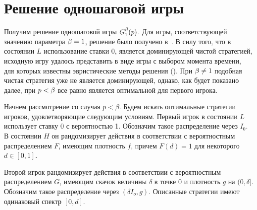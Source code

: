 {\section{Решение одношаговой игры}
\label{ch3:sec:1st}

Получим решение одношаговой игры $G^{\beta}_1(p)$.
Для игры, соответствующей значению параметра $\beta = 1$, решение было получено в~\cite{sandomirskaya12}.
В силу того, что в состоянии $L$ использование ставки $0$, является доминирующей чистой стратегией, исходную игру удалось представить в виде игры с выбором момента времени, для которых известны эвристические методы решения (\seename \cite{karlin64}).
При $\beta \neq 1$ подобная чистая стратегия уже не является доминирующей, однако, как будет показано далее, при $p < \beta$ все равно является оптимальной для первого игрока.

Начнем рассмотрение со случая $p < \beta$.
Будем искать оптимальные стратегии игроков, удовлетворяющие следующим условиям.
Первый игрок в состоянии $L$ использует ставку $0$ с вероятностью 1.
Обозначим такое распределение через $I_0$.
В состоянии $H$ он рандомизирует действия в соответствии с вероятностным распределением $F$, имеющим плотность $f$, причем $F(d) = 1$ для некоторого $d \in [0, 1]$.

Второй игрок рандомизирует действия в соответствии с вероятностным распределением $G$, имеющим скачок величины $\delta$ в точке $0$ и плотность $g$ на $(0, \delta]$.
Обозначим такое распределение через $(\delta I_o, g)$.
Описанные стратегии имеют одинаковый спектр $[0, d]$.

}
